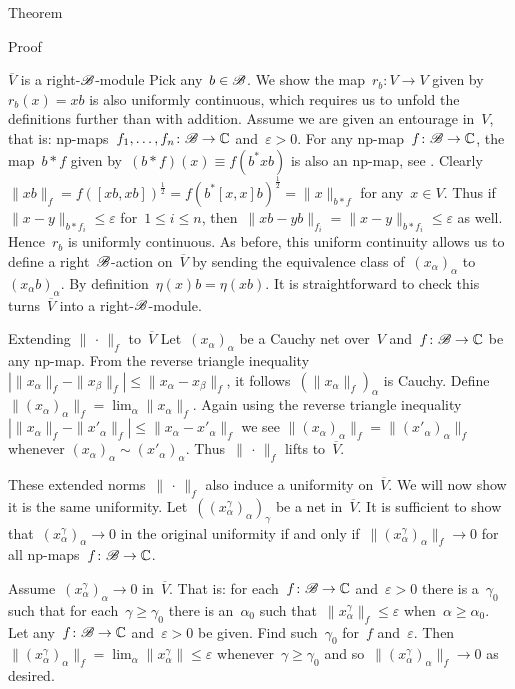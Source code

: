 \begin{parsec}
\begin{point}{Theorem}
\begin{point}{Proof}
\begin{point}{$\overline{V}$ is a right-$\mathscr{B}$-module}
Pick any~$b \in \mathscr{B}$. We show the map~$r_b\colon V \to V$
given by~$r_b(x) = xb$ is also uniformly continuous,
which requires us to unfold the definitions further
than with addition.
Assume we are given an entourage in~$V$,
that is: np-maps~$f_1,\ldots,f_n\colon \mathscr{B} \to \mathbb{C}$
and~$\varepsilon > 0$.
For any np-map~$f\colon \mathscr{B} \to \mathbb{C}$,
    the map~$b*f$ given by~$(b * f)(x) \equiv f(b^* x b)$ is also an np-map,
    see .
    Clearly~$\|xb\|_f = f([xb,xb])^{\frac{1}{2}}
    = f(b^* [x,x] b)^{\frac{1}{2}} = \|x\|_{b*f}$
    for any~$x \in V$.
Thus if~$\|x-y\|_{b*f_i} \leq \varepsilon$ for~$1 \leq i \leq n$,
then~$\|xb-yb\|_{f_i} = \|x-y\|_{b*f_i} \leq \varepsilon$
as well. Hence~$r_b$ is uniformly continuous.
As before, this uniform continuity
allows us to define a right~$\mathscr{B}$-action on~$\overline{V}$
by sending the equivalence class of~$(x_\alpha)_\alpha$
to~$(x_\alpha b)_\alpha$. By definition~$\eta(x)b = \eta(xb)$.
It is straightforward to check this turns~$\overline{V}$
into a right-$\mathscr{B}$-module.
\end{point}
\begin{point}{Extending $\|\,\cdot\,\|_f$ to~$\overline{V}$}%
Let~$(x_\alpha)_\alpha$ be a Cauchy net over~$V$
    and~$f\colon \mathscr{B} \to \mathbb{C}$ be any np-map.
From the reverse triangle inequality~$| \|x_\alpha \|_f - \|x_\beta\|_f |
        \leq \|x_\alpha - x_\beta \|_f$,
        it follows~$(\| x_\alpha \|_f)_\alpha$ is Cauchy.
Define~$\|(x_\alpha)_\alpha\|_f = \lim_\alpha \|x_\alpha\|_f$.
Again using the reverse triangle
    inequality~$| \|x_\alpha \|_f - \|x'_\alpha\|_f |
        \leq \|x_\alpha - x'_\alpha \|_f$
        we see $\|(x_\alpha)_\alpha\|_f =
        \|(x'_\alpha)_\alpha\|_f$
        whenever $(x_\alpha)_\alpha \sim (x'_\alpha)_\alpha$.
Thus~$\|\,\cdot\,\|_f$ lifts to~$\overline{V}$.

These extended norms~$\|\,\cdot\,\|_f$ also induce a uniformity
    on~$\overline{V}$.  We will now show it is the same uniformity.
    Let~$((x_\alpha^\gamma)_\alpha)_\gamma$ be a net in~$\overline{V}$.
    It is sufficient to show that~$(x_\alpha^\gamma)_\alpha \to 0$
    in the original uniformity
    if and only if~$\|(x_\alpha^\gamma)_\alpha\|_f \to 0$
        for all np-maps~$f\colon \mathscr{B} \to \mathbb{C}$.

Assume~$(x^\gamma_\alpha)_\alpha \to 0$ in~$\overline{V}$.
That is: for each~$f\colon \mathscr{B} \to \mathbb{C}$ and~$\varepsilon > 0$
    there is a~$\gamma_0$
    such that for each~$\gamma \geq \gamma_0$
    there is an~$\alpha_0$
    such that~$\|x^\gamma_\alpha\|_f \leq \varepsilon$
    when~$\alpha \geq \alpha_0$.
Let any~$f\colon \mathscr{B} \to \mathbb{C}$ and~$\varepsilon > 0$ be given.
Find such~$\gamma_0$ for~$f$ and~$\varepsilon$.
Then~$\|(x^\gamma_\alpha)_\alpha \|_f
    = \lim_\alpha \|x^\gamma_\alpha\| \leq \varepsilon$
    whenever~$\gamma \geq \gamma_0$
    and so~$\|(x^\gamma_\alpha)_\alpha\|_f \to 0$ as desired.


\end{point}
\end{point}
\end{point}
\end{parsec}
